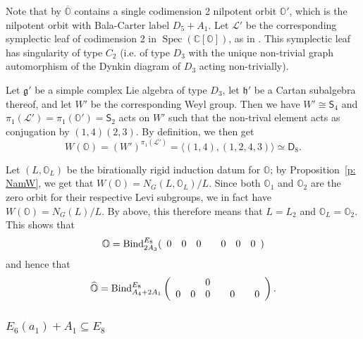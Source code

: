 \documentclass[11pt]{amsart}
\newcommand{\C}{{\mathbb C}}
\renewcommand{\O}{{\mathbb O}}
\newcommand{\g}{{\mathfrak g}}
\newcommand{\h}{{\mathfrak h}}
\newcommand{\cL}{{\mathcal L}}
\newcommand{\Spec}{\operatorname{Spec}}
\newcommand{\Dih}{{\mathsf{D}}}
\newcommand{\Sym}{{\mathsf{S}}}
\newcommand{\BInd}{{{\mbox{\rm Bind}}}}
\newcommand{\hatO}{\widehat{\O}}
\numberwithin{equation}{section}
\begin{document}
	Note that by \cite{FJLS} $\overline{\O}$ contains a single codimension 2 nilpotent orbit $\O'$, which is the nilpotent orbit with Bala-Carter label $D_5+A_1$. Let $\cL'$ be the corresponding symplectic leaf of codimension 2 in $\Spec(\C[\O])$, as in \cite[Lemma 3.2.2]{MM}. This symplectic leaf has singularity of type $C_2$ (i.e. of type $D_3$ with the unique non-trivial graph automorphism of the Dynkin diagram of $D_3$ acting non-trivially).
	
	Let $\g'$ be a simple complex Lie algebra of type $D_3$, let $\h'$ be a Cartan subalgebra thereof, and let $W'$ be the corresponding Weyl group. Then we have $W'\cong \Sym_4$ and $\pi_1(\cL')=\pi_1(\O')=\Sym_2$ acts on $W'$ such that the non-trival element acts as conjugation by $(1,4)(2,3)$. By definition, we then get $$W(\O)=(W')^{\pi_1(\cL')}=\langle(1,4),(1,2,4,3)\rangle\simeq \Dih_8.$$
	
	Let $(L,\O_L)$ be the birationally rigid induction datum for $\O$; by Proposition~\ref{p: NamW}, we get that $W(\O)=N_G(L,\O_L)/L$. Since both $\O_1$ and $\O_2$ are the zero orbit for their respective Levi subgroups, we in fact have $W(\O)=N_G(L)/L$. By above, this therefore means that $L=L_2$ and $\O_L=\O_2$. This shows that $$\O=\BInd_{2 A_3}^{E_8}(\begin{array}{c c c c c c c}
		0 & 0 & 0 & & 0 & 0 & 0\\
	\end{array})$$ and hence that $$\hatO=\BInd_{A_4 + 2 A_1}^{E_8}\left(\begin{array}{c c c c c c c}
		& & 0 & & & & \\
		0 & 0 & 0 & & 0& & 0  \\
	\end{array}\right).$$
	
	
	\subsubsection{\texorpdfstring{$E_6(a_1)+A_1\subseteq E_8$}{E6a1A1 in E8}}\label{sss: E6a1A1 in E8}
	
\end{document}

